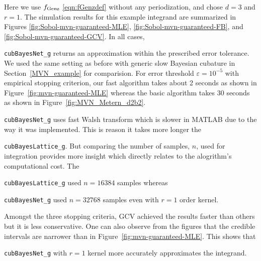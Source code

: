 \documentclass{iitthesis}          %
\newcommand{\code}[1]{\texttt{#1}}
\newcommand\figref{Figure~\ref}
\newcommand\secref{Section~\ref}
\begin{document}
\Subsection{Using \code{cubBayesNet\_g}}
Here we use $ f_{\textup{Genz}}$ \eqref{eqn:fGenzdef} without any periodization, and chose $d=3$ and $r=1$. The simulation results for this example integrand are summarized in Figures \ref{fig:Sobol-mvn-guaranteed-MLE}, \ref{fig:Sobol-mvn-guaranteed-FB}, and \ref{fig:Sobol-mvn-guaranteed-GCV}.  In all cases, {\code{cubBayesNet\_g} returns an approximation within the prescribed error tolerance. We used the same setting as before with generic slow Bayesian cubature in \secref{MVN_example} for comparision. For error threshold $\varepsilon=10^{-5}$ with empirical stopping criterion, our fast algorithm takes about 2 seconds as shown in \figref{fig:mvn-guaranteed-MLE} whereas the basic algorithm takes 30 seconds as shown in \figref{fig:MVN_Metern_d2b2}. 
{\code{cubBayesNet\_g} uses fast Walsh transform which is slower in MATLAB due to the way it was implemented. This is reason it takes more longer the {\code{cubBayesLattice\_g}. 
But comparing the number of samples, $n$, used for integration provides more insight which directly relates to the alogrithm's computational cost. The {\code{cubBayesLattice\_g} used $n=16384$ samples whereas {\code{cubBayesNet\_g} used $n=32768$ samples even with $r=1$ order kernel.

Amongst the three stopping criteria, GCV achieved the results faster than others but it is less conservative. 
One can also observe from the figures that the credible intervals are narrower than in \figref{fig:mvn-guaranteed-MLE}.
This shows that {\code{cubBayesNet\_g} with $r=1$ kernel more accurately approximates the integrand.

}}}}}}
\end{document}
